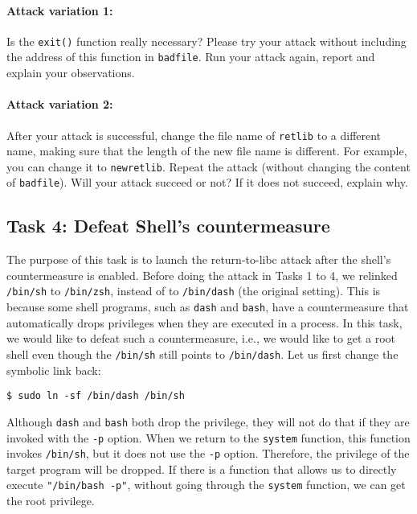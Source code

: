 \paragraph{Attack variation 1:}
Is the \texttt{exit()} function really necessary? Please try 
your attack without including the address of this function in
\texttt{badfile}. Run your attack again, report and explain your
observations.  



\paragraph{Attack variation 2:} 
After your attack is successful, change the file name of \texttt{retlib}
to a different name, making sure that the length of the new 
file name is different. For example, you can change it to \texttt{newretlib}. 
Repeat the attack (without changing the content of {\tt badfile}). 
Will your attack succeed or not?  If it does not succeed, explain why.


\subsection{Task 4: Defeat Shell's countermeasure}

The purpose of this task is to launch the return-to-libc attack after 
the shell's countermeasure is enabled. 
Before doing the attack in Tasks 1 to 4, we relinked \texttt{/bin/sh} to \texttt{/bin/zsh},
instead of to \texttt{/bin/dash} (the original setting). This is because some shell programs, such 
as \texttt{dash} and \texttt{bash}, have a countermeasure that automatically 
drops privileges when they are executed in a \setuid process. In this task, we 
would like to defeat such a countermeasure, i.e., we would like to get a root shell even though
the \texttt{/bin/sh} still points to \texttt{/bin/dash}.   
Let us first change the symbolic link back:

\begin{lstlisting}
$ sudo ln -sf /bin/dash /bin/sh
\end{lstlisting}

Although \texttt{dash} and \texttt{bash} both drop the \setuid privilege,
they will not do that if they are invoked with the \texttt{-p} option. When
we return to the \texttt{system} function, this function invokes \texttt{/bin/sh}, 
but it does not use the \texttt{-p} option. Therefore, the \setuid
privilege of the target program will be dropped. If there is a function
that allows us to directly execute \texttt{"/bin/bash -p"}, without going
through the \texttt{system} function, we can get the root privilege. 


